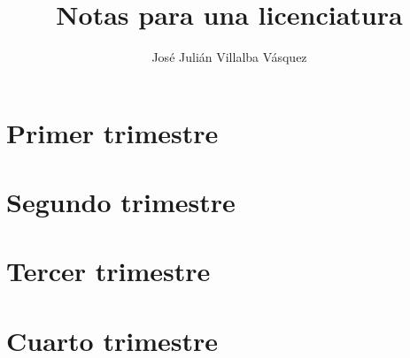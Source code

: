 \documentclass[
	12pt,
	fleqn,
	twosides,
]{book}
\title{Notas para una licenciatura}
\author{José Julián Villalba Vásquez}
\begin{document}
\layout

\maketitle



\part{Primer trimestre}







\part{Segundo trimestre}







\part{Tercer trimestre}





% 



\part{Cuarto trimestre}







% 
\end{document}
